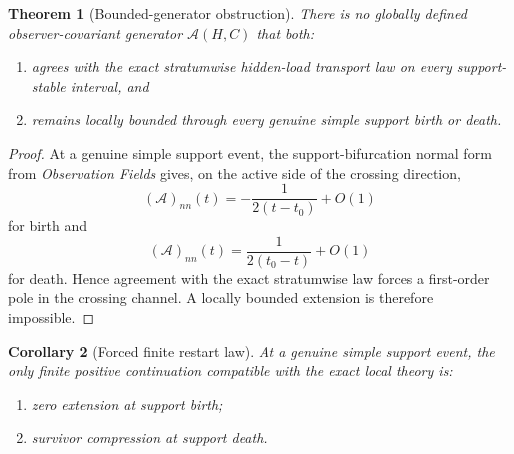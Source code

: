 \documentclass[11pt,a4paper]{article}
\numberwithin{equation}{section}
\theoremstyle{thmcompact}
\newtheorem{theorem}{Theorem}[section]
\newtheorem{corollary}[theorem]{Corollary}
\theoremstyle{remark}
\begin{document}
\begin{theorem}[Bounded-generator obstruction]
\label{thm:bounded-obstruction}
There is no globally defined observer-covariant generator $\mathcal A(H,C)$ that both:
\begin{enumerate}
\item agrees with the exact stratumwise hidden-load transport law on every support-stable interval, and
\item remains locally bounded through every genuine simple support birth or death.
\end{enumerate}
\end{theorem}

\begin{proof}
At a genuine simple support event, the support-bifurcation normal form from \emph{Observation Fields} gives, on the active side of the crossing direction,
\[
(\mathcal A)_{nn}(t)= -\frac{1}{2(t-t_0)}+O(1)
\]
for birth and
\[
(\mathcal A)_{nn}(t)= \frac{1}{2(t_0-t)}+O(1)
\]
for death. Hence agreement with the exact stratumwise law forces a first-order pole in the crossing channel. A locally bounded extension is therefore impossible.
\end{proof}

\begin{corollary}[Forced finite restart law]
\label{cor:forced-restart}
At a genuine simple support event, the only finite positive continuation compatible with the exact local theory is:
\begin{enumerate}
\item zero extension at support birth;
\item survivor compression at support death.
\end{enumerate}
\end{corollary}
\end{document}
